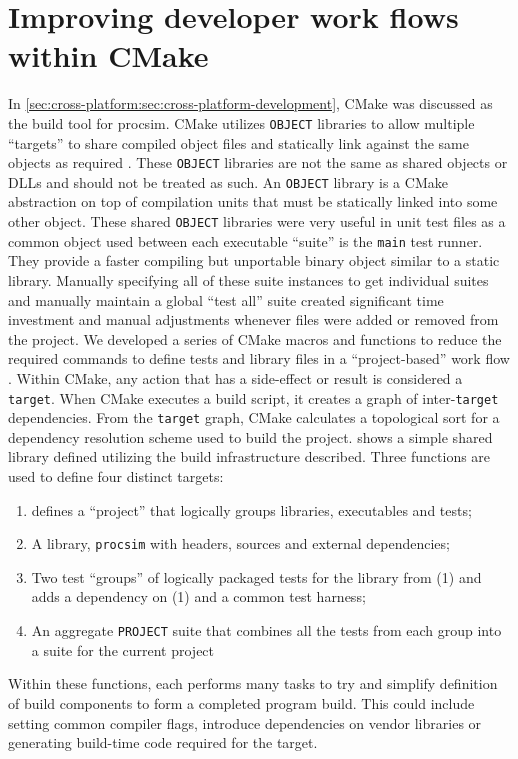 \section{Improving developer work flows within CMake}
\label{sec:cross-platform:sec:cmake-flows}

In \cref{sec:cross-platform:sec:cross-platform-development}, CMake was discussed as the build tool for procsim. CMake utilizes \texttt{OBJECT} libraries to allow multiple ``targets'' to share compiled object files and statically link against the same objects as required \cite{CMake:add_library}. These \texttt{OBJECT} libraries are not the same as shared objects or DLLs and should not be treated as such. An \texttt{OBJECT} library is a CMake abstraction on top of compilation units that must be statically linked into some other object. These shared \texttt{OBJECT} libraries were very useful in unit test files as a common object used between each executable ``suite'' is the \texttt{main} test runner. They provide a faster compiling but unportable binary object similar to a static library. Manually specifying all of these suite instances to get individual suites and manually maintain a global ``test all'' suite created significant time investment and manual adjustments whenever files were added or removed from the project. We developed a series of CMake macros and functions to reduce the required commands to define tests and library files in a ``project-based'' work flow \cite{CMake:macro, CMake:function}. Within CMake, any action that has a side-effect or result is considered a \texttt{target}. When CMake executes a build script, it creates a graph of inter-\texttt{target} dependencies. From the \texttt{target} graph, CMake calculates a topological sort for a dependency resolution scheme used to build the project.  shows a simple shared library defined utilizing the build infrastructure described. Three functions are used to define four distinct targets: 
\begin{enumerate}
    \item {} defines a ``project'' that logically groups libraries, executables and tests;
    \item A library, \texttt{procsim} with headers, sources and external dependencies;
    \item Two test ``groups'' of logically packaged tests for the library from (1) and adds a dependency on (1) and a common test harness;
    \item An aggregate \texttt{PROJECT} suite that combines all the tests from each group into a suite for the current project
\end{enumerate}
Within these functions, each performs many tasks to try and simplify definition of build components to form a completed program build. This could include setting common compiler flags, introduce dependencies on vendor libraries or generating build-time code required for the target. 

